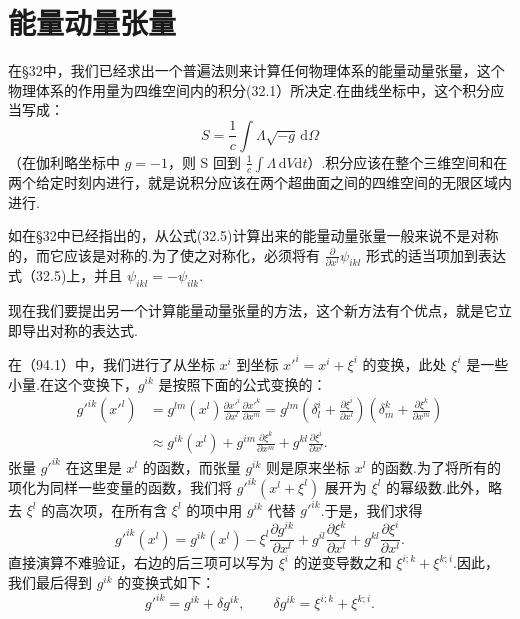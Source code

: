 \section{能量动量张量}

在§32中，我们已经求出一个普遍法则来计算任何物理体系的能量动量张量，这个物理体系的作用量为四维空间内的积分(32.1）所决定.在曲线坐标中，这个积分应当写成：
\begin{equation}
  S=\frac{1}{c}\int\varLambda\sqrt{-g}\,\mathrm{d}\varOmega
\end{equation}
（在伽利略坐标中 $g=-1$，则 S 回到 $\frac{1}{c}\int\varLambda\,\mathrm{d}V\mathrm{d}t$）.积分应该在整个三维空间和在两个给定时刻内进行，就是说积分应该在两个超曲面之间的四维空间的无限区域内进行.

如在§32中已经指出的，从公式(32.5)计算出来的能量动量张量一般来说不是对称的，而它应该是对称的.为了使之对称化，必须将有 $\frac{\partial}{\partial x^l}\psi_{ikl}$ 形式的适当项加到表达式（32.5)上，并且 $\psi_{ikl}=-\psi_{ilk}$.

现在我们要提出另一个计算能量动量张量的方法，这个新方法有个优点，就是它立即导出对称的表达式.

在（94.1）中，我们进行了从坐标 $x^i$ 到坐标 $x'^i=x^i+\xi^i$ 的变换，此处 $\xi^i$ 是一些小量.在这个变换下，$g^{ik}$ 是按照下面的公式变换的：
\begin{equation*}
\begin{aligned}
  g'^{ik}(x'^l)&=g^{lm}(x^l)\frac{\partial x'^i}{\partial x^l}
  \frac{\partial x'^k}{\partial x^m}
  =g^{lm}\left(\delta^i_l+\frac{\partial\xi^i}{\partial x^l}\right)
  \left(\delta^k_m+\frac{\partial\xi^k}{\partial x^m}\right)\\
  &\approx g^{ik}(x^l)+g^{im}\frac{\partial\xi^k}{\partial x^m}
  +g^{kl}\frac{\partial\xi^i}{\partial x^l}.
\end{aligned}
\end{equation*}
张量 $g'^{ik}$ 在这里是 $x^l$ 的函数，而张量 $g^{ik}$ 则是原来坐标 $x^l$ 的函数.为了将所有的项化为同样一些变量的函数，我们将 $g'^{ik}(x^l+\xi^l)$ 展开为 $\xi^l$ 的幂级数.此外，略去 $\xi^l$ 的高次项，在所有含 $\xi^l$ 的项中用 $g^{ik}$ 代替 $g'^{ik}$.于是，我们求得
\begin{equation*}
  g'^{ik}(x^l)=g^{ik}(x^l)-\xi^l\frac{\partial g^{ik}}{\partial x^l}
  +g^{il}\frac{\partial\xi^k}{\partial x^l}
  +g^{kl}\frac{\partial\xi^i}{\partial x^l}.
\end{equation*}
直接演算不难验证，右边的后三项可以写为 $\xi^i$ 的逆变导数之和 $\xi^{i;k}+\xi^{k;i}$.因此，我们最后得到 $g^{ik}$ 的变换式如下：
\begin{equation}
  g'^{ik}=g^{ik}+\delta g^{ik},\qquad
  \delta g^{ik}=\xi^{i;k}+\xi^{k;i}.
\end{equation}

